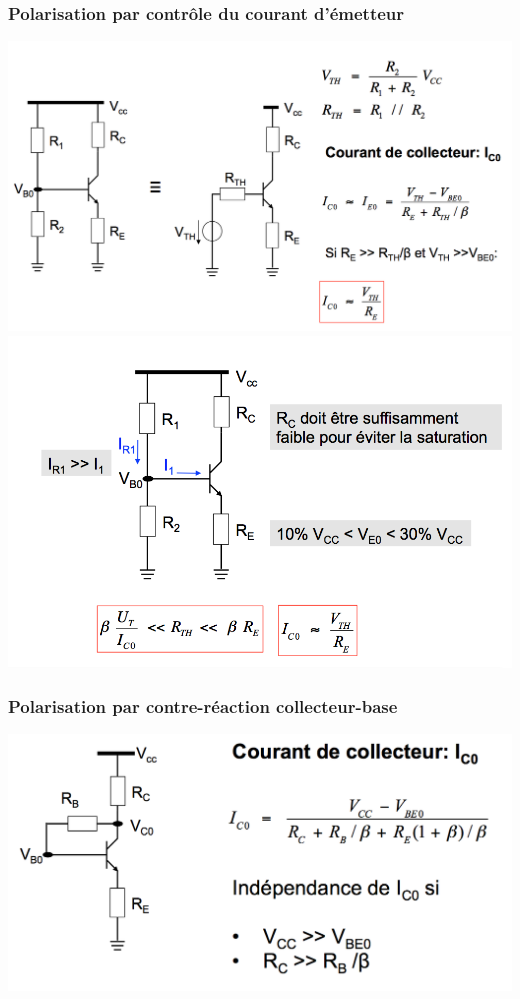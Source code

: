 \documentclass[]{article}
\begin{document}
\subsubsection{Polarisation par contrôle du courant d'émetteur}
\includegraphics[scale=0.3]{polcourem}
\includegraphics[scale=0.3]{polcourem2}

\subsubsection{Polarisation par contre-réaction collecteur-base}
\includegraphics[scale=0.5]{polcolbase}
\end{document}

